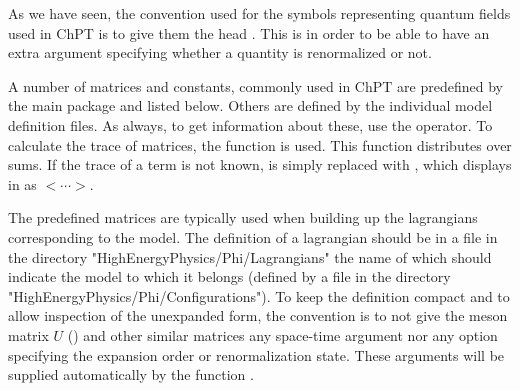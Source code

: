 As we have seen, the convention used for the symbols representing quantum fields used in ChPT
is to give them the head . This is in order to be able to have an extra argument
specifying whether a quantity is renormalized or not.



A number of matrices and constants, commonly used in ChPT are predefined by the main
package \fphi and listed below. Others are defined by the individual model definition files.
As always, to get information about these, use the  operator.
To calculate the trace of matrices, the function  is used.
This function distributes over sums. If the trace of a term is not known,  is
simply replaced with , which displays in  as $< \cdots >$.



The predefined matrices are typically used when building up the lagrangians corresponding to
the model. The definition of a lagrangian should be in a file in the directory
"HighEnergyPhysics/Phi/Lagrangians" the name of which should indicate the model to which
it belongs (defined by a file in the directory "HighEnergyPhysics/Phi/Configurations").
To keep the definition compact and to allow inspection of the unexpanded form, the convention
is to not give the meson matrix $U$ (\mb[MM]) and other similar matrices any space-time argument
nor any option specifying the expansion order or renormalization state.
These arguments will be supplied automatically by the function .

